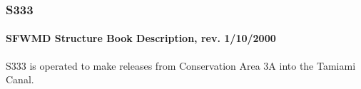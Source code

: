 
%
%


\clearpage
\subsubsection{S333}

\paragraph{SFWMD Structure Book Description, rev. 1/10/2000}
S333 is operated to make releases from Conservation Area 3A into the Tamiami Canal.

